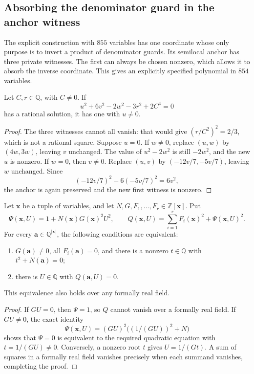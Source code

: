 \subsection{Absorbing the denominator guard in the anchor witness}
\label{subsec:anchor-guard-854}

The explicit construction with $855$ variables has one coordinate whose
only purpose is to invert a product of denominator guards. Its semilocal
anchor has three private witnesses. The first can always be chosen
nonzero, which allows it to absorb the inverse coordinate. This gives an
explicitly specified polynomial in $854$ variables.

\begin{lemma}\label{lem:nonzero-anchor-witness}
Let $C,r\in\mathbb Q$, with $C\ne0$. If
\[
 u^2+6v^2-2w^2-3r^2+2C^4=0
\]
has a rational solution, it has one with $u\ne0$.
\end{lemma}
\begin{proof}
The three witnesses cannot all vanish: that would give
$(r/C^2)^2=2/3$, which is not a rational square. Suppose $u=0$.
If $w\ne0$, replace $(u,w)$ by $(4w,3w)$, leaving $v$ unchanged.
The value of $u^2-2w^2$ is still $-2w^2$, and the new $u$ is nonzero.
If $w=0$, then $v\ne0$. Replace $(u,v)$ by
$(-12v/7,-5v/7)$, leaving $w$ unchanged. Since
\[
 (-12v/7)^2+6(-5v/7)^2=6v^2,
\]
the anchor is again preserved and the new first witness is nonzero.
\end{proof}

\begin{proposition}\label{prop:private-quadratic-guard}
Let $\mathbf x$ be a tuple of variables, and let
$N,G,F_1,\ldots,F_r\in\mathbb Z[\mathbf x]$. Put
\[
 \Psi(\mathbf x,U)=1+N(\mathbf x)G(\mathbf x)^2U^2,
 \qquad
 Q(\mathbf x,U)=\sum_{i=1}^r F_i(\mathbf x)^2+\Psi(\mathbf x,U)^2.
\]
For every $\mathbf a\in\mathbb Q^{\lvert\mathbf x\rvert}$, the following
conditions are equivalent:
\begin{enumerate}
\item $G(\mathbf a)\ne0$, all $F_i(\mathbf a)=0$, and there is a
      nonzero $t\in\mathbb Q$ with $t^2+N(\mathbf a)=0$;
\item there is $U\in\mathbb Q$ with $Q(\mathbf a,U)=0$.
\end{enumerate}
This equivalence also holds over any formally real field.
\end{proposition}
\begin{proof}
If $GU=0$, then $\Psi=1$, so $Q$ cannot vanish over a formally real
field. If $GU\ne0$, the exact identity
\begin{equation}\label{eq:anchor-reciprocal-nonzero}
 \Psi(\mathbf x,U)=(GU)^2\bigl((1/(GU))^2+N\bigr)
\end{equation}
shows that $\Psi=0$ is equivalent to the required quadratic equation
with $t=1/(GU)\ne0$. Conversely, a nonzero root $t$ gives
$U=1/(Gt)$. A sum of squares in a formally real field vanishes
precisely when each summand vanishes, completing the proof.
\end{proof}

